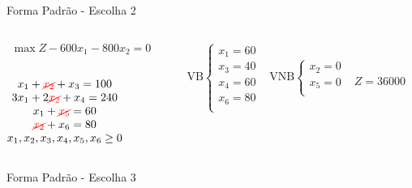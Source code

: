 \documentclass{beamer}
\begin{document}
\begin{frame}
{\begin{block}{Forma Padrão - {\color{cyan}Escolha 2}}
			\begin{columns}
				\begin{column}{0.35\textwidth}
					$
						\begin{matrix}
							\max Z - 600x_1 - 800x_2 = 0 \\
						\end{matrix}
					$ \\
					 \\
					$
						\begin{matrix}
							x_1  + {\color{red}\cancel{x_2}}  + x_3                   = 100 \\
							3x_1 + 2{\color{red}\cancel{x_2}}       + x_4             = 240 \\
							x_1                     + {\color{red}\cancel{x_5}}       = 60 \\
							{\color{red}\cancel{x_2}}                           + x_6 = 80 \\
							x_1,x_2, x_3, x_4, x_5, x_6 \ge 0 \\
						\end{matrix}
					$
				\end{column}
				\vline
				\hspace{0.1cm}
				\begin{column}{0.45\textwidth}
						$
							\begin{matrix}
								\text{VB} \left\{  \begin{matrix}
																 x_1 = 60 \\
																 x_3 = 40 \\
																 x_4 = 60 \\
																 x_6 = 80 \\
												   \end{matrix} 
										   \right.
								&
								\text{VNB} \left\{  \begin{matrix}
																 x_2 = 0 \\
																 x_5 = 0 \\
												   \end{matrix} 
										   \right. 
								\\
							 & \\
							\end{matrix}							
						$
						{\color{red}$ Z = 36000 $}
				\end{column}
			\end{columns}
		\end{block}
	}
	{
		\begin{block}{Forma Padrão - {\color{cyan}Escolha 3}}

\end{block}}
\end{frame}
\end{document}
